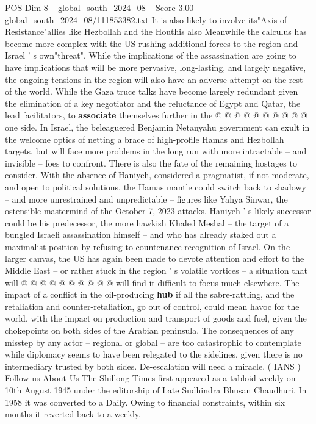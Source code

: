 \begin{textsample}{POS Dim 8 – global\_south\_2024\_08 – Score 3.00 – global\_south\_2024\_08/111853382.txt}
It is also likely to involve its"Axis of Resistance"allies like Hezbollah and the Houthis also Meanwhile the calculus has become more complex with the US rushing additional forces to the region and Israel ' s own"threat".
While the implications of the assassination are going to have implications that will be more pervasive, long-lasting, and largely negative, the ongoing tensions in the region will also have an adverse attempt on the rest of the world.
While the Gaza truce talks have become largely redundant given the elimination of a key negotiator and the reluctance of Egypt and Qatar, the lead facilitators, to \textbf{associate} themselves further in the @ @ @ @ @ @ @ @ @ @ one side.
In Israel, the beleaguered Benjamin Netanyahu government can exult in the welcome optics of netting a brace of high-profile Hamas and Hezbollah targets, but will face more problems in the long run with more intractable -- and invisible -- foes to confront.
There is also the fate of the remaining hostages to consider.
With the absence of Haniyeh, considered a pragmatist, if not moderate, and open to political solutions, the Hamas mantle could switch back to shadowy -- and more unrestrained and unpredictable -- figures like Yahya Sinwar, the ostensible mastermind of the October 7, 2023 attacks.
Haniyeh ' s likely successor could be his predecessor, the more hawkish Khaled Meshal -- the target of a bungled Israeli assassination himself -- and who has already staked out a maximalist position by refusing to countenance recognition of Israel.
On the larger canvas, the US has again been made to devote attention and effort to the Middle East -- or rather stuck in the region ' s volatile vortices -- a situation that will @ @ @ @ @ @ @ @ @ @ will find it difficult to focus much elsewhere.
The impact of a conflict in the oil-producing \textbf{hub} if all the sabre-rattling, and the retaliation and counter-retaliation, go out of control, could mean havoc for the world, with the impact on production and transport of goods and fuel, given the chokepoints on both sides of the Arabian peninsula.
The consequences of any misstep by any actor -- regional or global -- are too catastrophic to contemplate while diplomacy seems to have been relegated to the sidelines, given there is no intermediary trusted by both sides.
De-escalation will need a miracle. ( IANS ) Follow us About Us The Shillong Times first appeared as a tabloid weekly on 10th August 1945 under the editorship of Late Sudhindra Bhusan Chaudhuri.
In 1958 it was converted to a Daily.
Owing to financial constraints, within six months it reverted back to a weekly.

\end{textsample}
